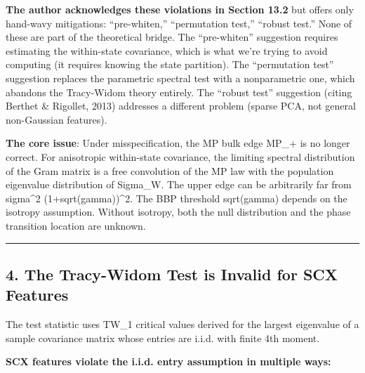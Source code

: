 \documentclass[
  12pt,
]{article}
\begin{document}
\textbf{The author acknowledges these violations in Section 13.2} but
offers only hand-wavy mitigations: ``pre-whiten,'' ``permutation test,''
``robust test.'' None of these are part of the theoretical bridge. The
``pre-whiten'' suggestion requires estimating the within-state
covariance, which is what we're trying to avoid computing (it requires
knowing the state partition). The ``permutation test'' suggestion
replaces the parametric spectral test with a nonparametric one, which
abandons the Tracy-Widom theory entirely. The ``robust test'' suggestion
(citing Berthet \& Rigollet, 2013) addresses a different problem (sparse
PCA, not general non-Gaussian features).

\textbf{The core issue}: Under misspecification, the MP bulk edge MP\_+
is no longer correct. For anisotropic within-state covariance, the
limiting spectral distribution of the Gram matrix is a free convolution
of the MP law with the population eigenvalue distribution of Sigma\_W.
The upper edge can be arbitrarily far from sigma\^{}2
(1+sqrt(gamma))\^{}2. The BBP threshold sqrt(gamma) depends on the
isotropy assumption. Without isotropy, both the null distribution and
the phase transition location are unknown.

\begin{center}\rule{0.5\linewidth}{0.5pt}\end{center}

\subsection{4. The Tracy-Widom Test is Invalid for SCX
Features}\label{the-tracy-widom-test-is-invalid-for-scx-features}

The test statistic uses TW\_1 critical values derived for the largest
eigenvalue of a sample covariance matrix whose entries are i.i.d. with
finite 4th moment.

\textbf{SCX features violate the i.i.d. entry assumption in multiple
ways:}
\end{document}
